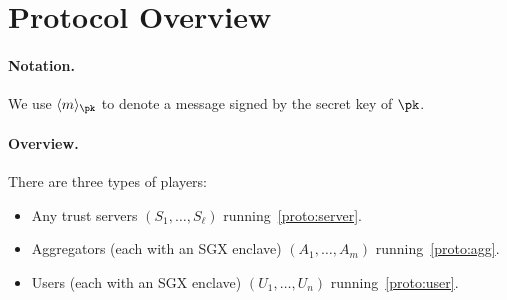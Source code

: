 \section{Protocol Overview}

\paragraph{Notation.} We use $\signed{m}{\pk}$ to denote a message signed by the secret key of $\pk$.

\paragraph{Overview.}

There are three types of players:

\begin{itemize}
    \item Any trust servers $(S_1, \dots, S_\ell)$ running~\cref{proto:server}.
    \item Aggregators (each with an SGX enclave) $(A_1, \dots, A_m)$ running~\cref{proto:agg}.
    \item Users (each with an SGX enclave) $(U_1, \dots, U_n)$ running~\cref{proto:user}.
\end{itemize}

